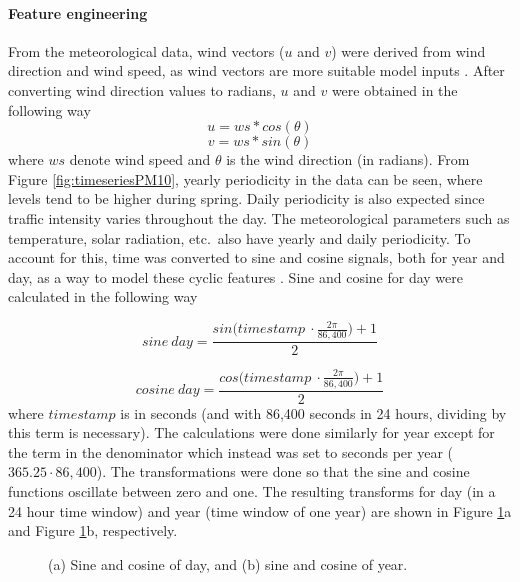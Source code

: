 \paragraph{Feature engineering}
From the meteorological data, wind vectors ($u$ and $v$) were derived from wind direction and wind speed, as wind vectors are more suitable model inputs \cite{tensorflow-timeseries}. After converting wind direction values to radians, $u$ and $v$ were obtained in the following way $$ u = ws * cos(\theta)$$ $$v = ws * sin(\theta)$$ where $ws$ denote wind speed and $\theta$ is the wind direction (in radians). From Figure \ref{fig:timeseriesPM10}, yearly periodicity in the data can be seen, where levels tend to be higher during spring. Daily periodicity is also expected since traffic intensity varies throughout the day. The meteorological parameters such as temperature, solar radiation, etc.\ also have yearly and daily periodicity. To account for this, time was converted to sine and cosine signals, both for year and day, as a way to model these cyclic features \cite{FaganeliPucer2018}. Sine and cosine for day were calculated in the following way

$$ sine \: day = \frac{sin \Big (timestamp\: \cdot \frac{2\pi}{86,400} \Big)+1}{2} $$

$$ cosine \: day = \frac{cos \Big (timestamp\: \cdot \frac{2\pi}{86,400} \Big)+1}{2} $$
where $timestamp$ is in seconds (and with 86,400 seconds in 24 hours, dividing by this term is necessary). The calculations were done similarly for year except for the term in the denominator which instead was set to seconds per year ($365.25 \cdot 86,400 $). The transformations were done so that the sine and cosine functions oscillate between zero and one. The resulting transforms for day (in a 24 hour time window) and year (time window of one year) are shown in Figure \ref{fig:time_sine_cos}a and Figure \ref{fig:time_sine_cos}b, respectively.


\begin{figure}[h] 
\begin{center}
\caption{(a) Sine and cosine of day, and (b) sine and cosine of year.}
\label{fig:time_sine_cos}
\end{center}
\end{figure}

